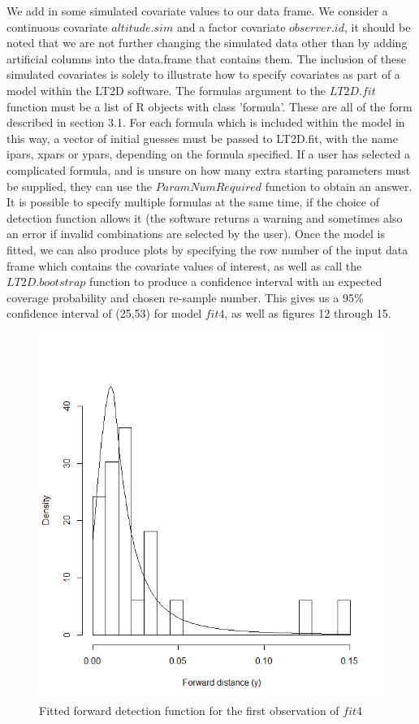 \documentclass[11pt]{article}
\begin{document}
\begin{multicols}{2}
We add in some simulated covariate values to our data frame. We consider a continuous covariate $altitude.sim$ and a factor covariate $observer.id$, it should be noted that we are not further changing the simulated data other than by adding artificial columns into the data.frame that contains them. The inclusion of these simulated covariates is solely to illustrate how to specify covariates as part of a model within the LT2D software. The formulas argument to the $LT2D.fit$ function must be a list of R objects with class 'formula'. These are all of the form described in section 3.1. For each formula which is included within the model in this way, a vector of initial guesses must be passed to LT2D.fit, with the name ipars, xpars or ypars, depending on the formula specified. If a user has selected a complicated formula, and is unsure on how many extra starting parameters must be supplied, they can use the $ParamNumRequired$ function to obtain an answer. It is possible to specify multiple formulas at the same time, if the choice of detection function allows it (the software returns a warning and sometimes also an error if invalid combinations are selected by the user). Once the model is fitted, we can also produce plots by specifying the row number of the input data frame which contains the covariate values of interest, as well as call the $LT2D.bootstrap$ function to produce a confidence interval with an expected coverage probability and chosen re-sample number.
This gives us a 95\% confidence interval of (25,53) for model $fit4$, as well as figures 12 through 15.\\


\begin{figure}[H]
\center
\includegraphics[scale=0.5]{fig13}
\caption{Fitted forward detection function for the first observation of $fit4$}
\end{figure}


\end{multicols}
\end{document}
